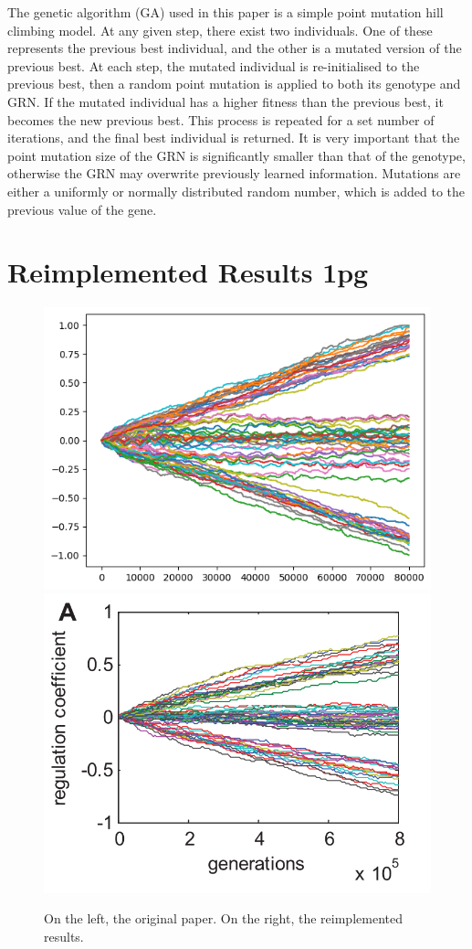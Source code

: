 \documentclass[twocolumn,a4paper]{article}
\begin{document}
    The genetic algorithm (GA) used in this paper is a simple point mutation hill climbing model. At any given step, there exist two individuals. One of these represents the previous best individual, and the other is a mutated version of the previous best. At each step, the mutated individual is re-initialised to the previous best, then a random point mutation is applied to both its genotype and GRN. If the mutated individual has a higher fitness than the previous best, it becomes the new previous best. This process is repeated for a set number of iterations, and the final best individual is returned. It is very important that the point mutation size of the GRN is significantly smaller than that of the genotype, otherwise the GRN may overwrite previously learned information. Mutations are either a uniformly or normally distributed random number, which is added to the previous value of the gene.

    \section{Reimplemented Results 1pg}
    \begin{figure}[h]
        \centering
        \includegraphics[width=0.48\linewidth]{img/fig2a.png}
        \includegraphics[width=0.48\linewidth]{orig_img/fig2a.png}
        \caption{On the left, the original paper. On the right, the reimplemented results.}
    \end{figure}
\end{document}
